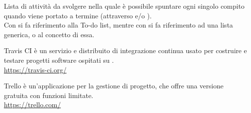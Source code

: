 Lista di attività da svolgere nella quale è possibile spuntare ogni singolo compito quando viene portato a termine (attraverso  e/o ).\\
Con  si fa riferimento alla  To-do list, mentre con  si fa riferimento ad una lista generica, o al concetto di essa.

Travis CI è un servizio  e distribuito di integrazione continua usato per costruire e testare progetti software ospitati su .\\
\url{https://travis-ci.org/}

Trello è un’applicazione per la gestione di progetto, che offre una versione gratuita con funzioni limitate.\\
\url{https://trello.com/}
\clearpage

